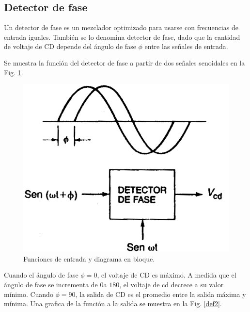 \documentclass[10pt,a4paper]{IEEEtran}
\begin{document}
    \subsection{Detector de fase}
    Un detector de fase es un mezclador optimizado para usarse con frecuencias de entrada iguales. También se lo denomina detector de fase, dado que la cantidad de voltaje de CD depende del ángulo de fase $\phi$ entre las señales de entrada.
    
    Se muestra la función del detector de fase a partir de dos señales senoidales en la Fig. \ref{def1}.
    
    \begin{figure}[H]
        \centering
        \includegraphics[scale=0.3]{def1.png}
        \caption{Funciones de entrada y diagrama en bloque.}
        \label{def1}
    \end{figure}
    
    Cuando el ángulo de fase $\phi=0$, el voltaje de CD es máximo. A medida que el ángulo de fase se incrementa de $0$\textordmasculine  a $180$\textordmasculine, el voltaje de cd decrece a su valor mínimo. Cuando $\phi=90$\textordmasculine, la salida de CD es el promedio entre la salida máxima y mínima. Una grafica de la función a la salida se muestra en la Fig. \ref{def2}.
    
\end{document}
